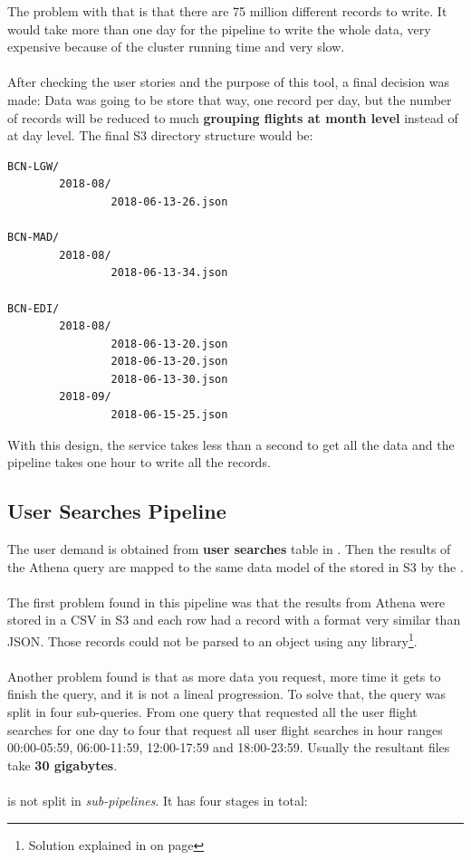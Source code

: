 The problem with that is that there are 75 million different records to write. It would take more than one day for the pipeline to write the whole data, very expensive because of the  cluster running time and very slow. 
\\\\
After checking the user stories and the purpose of this tool, a final decision was made: Data was going to be store that way, one record per day, but the number of records will be reduced to much \textbf{grouping flights at month level} instead of at day level. The final S3 directory structure would be:

\begin{verbatim}
BCN-LGW/
        2018-08/
                2018-06-13-26.json

BCN-MAD/
        2018-08/
                2018-06-13-34.json

BCN-EDI/
        2018-08/
                2018-06-13-20.json
                2018-06-13-20.json
                2018-06-13-30.json
        2018-09/
                2018-06-15-25.json
\end{verbatim}

With this design, the service takes less than a second to get all the data and the pipeline takes one hour to write all the records.


\subsection{User Searches Pipeline} \label{user-searches-pipeline}

The user demand is obtained from \textbf{user searches} table in . Then the results of the Athena query are mapped to the same data model of the stored in S3 by the .
\\\\
The first problem found in this pipeline was that the results from Athena were stored in a CSV\cite{csv} in S3 and each row had a record with a format very similar than JSON\cite{json}. Those records could not be parsed to an object using any library\footnote{Solution explained in  on page \pageref{regex}}.
\\\\
Another problem found is that as more data you request, more time it gets to finish the query, and it is not a lineal progression. To solve that, the query was split in four sub-queries. From one query that requested all the user flight searches for one day to four that request all user flight searches in hour ranges 00:00-05:59, 06:00-11:59, 12:00-17:59 and 18:00-23:59. Usually the resultant files take \textbf{30 gigabytes}.
\\\\
 is not split in \textit{sub-pipelines}. It has four stages in total:

